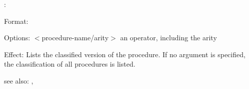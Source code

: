 \listclass:

Format: \\

Options: $<$procedure-name/arity$>$ an operator, including the arity

Effect: Lists the classified version of the procedure.
	If no argument is specified, the classification of all
	procedures is listed.


see also: \listing, \listcode
